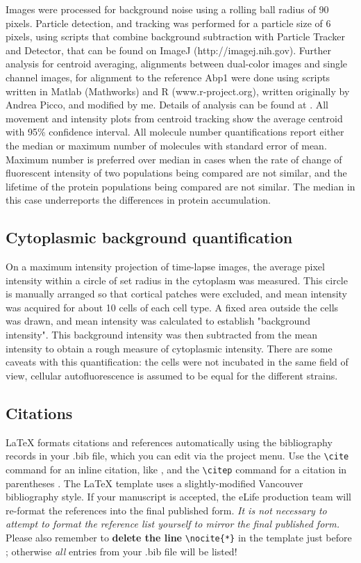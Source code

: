 \documentclass[9pt,lineno]{elife}
\begin{document}
Images were processed for background noise using a rolling ball radius of 90 pixels. Particle detection, and tracking was performed for a particle size of 6 pixels, using scripts that combine background subtraction with Particle Tracker and Detector, that can be found on ImageJ (http://imagej.nih.gov). Further analysis for centroid averaging, alignments between dual-color images and single channel images, for alignment to the reference Abp1 were done using scripts written in Matlab (Mathworks) and R (www.r-project.org), written originally by Andrea Picco, and modified by me. Details of analysis can be found at \citep{Picco2015}. All movement and intensity plots from centroid tracking show the average centroid with 95\% confidence interval. All molecule number quantifications report either the median or maximum number of molecules with standard error of mean. Maximum number is preferred over median in cases when the rate of change of fluorescent intensity of two populations being compared are not similar, and the lifetime of the protein populations being compared are not similar. The median in this case underreports the differences in protein accumulation.

\subsection{Cytoplasmic background quantification}
On a maximum intensity projection of time-lapse images, the average pixel intensity within a circle of set radius in the cytoplasm was measured. This circle is manually arranged so that cortical patches were excluded, and mean intensity was acquired for about 10 cells of each cell type. A fixed area outside the cells was drawn, and mean intensity was calculated to establish "background intensity". This background intensity was then subtracted from the mean intensity to obtain a rough measure of cytoplasmic intensity. There are some caveats with this quantification: the cells were not incubated in the same field of view, cellular autofluorescence is assumed to be equal for the different strains.

\subsection{Citations}

LaTeX formats citations and references automatically using the bibliography records in your .bib file, which you can edit via the project menu. Use the \verb|\cite| command for an inline citation, like \cite{Aivazian917}, and the \verb|\citep| command for a citation in parentheses \citep{Aivazian917}. The LaTeX template uses a slightly-modified Vancouver bibliography style. If your manuscript is accepted, the eLife production team will re-format the references into the final published form. \emph{It is not necessary to attempt to format the reference list yourself to mirror the final published form.} Please also remember to \textbf{delete the line} \verb|\nocite{*}| in the template just before \verb||; otherwise \emph{all} entries from your .bib file will be listed! 
\end{document}
